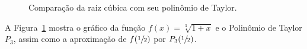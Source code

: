 \begin{figure}
  \begin{center}%
    \vspace{-0.2\baselineskip}%
    \scalebox{0.9}{}%
    \vspace{-\baselineskip}%
  \end{center}
  \caption{Comparação da raiz cúbica com seu polinômio de Taylor.}
  \label{fig:funcao_tayplor_sqrt3}
\end{figure}

A Figura~\ref{fig:funcao_tayplor_sqrt3} mostra o gráfico da função
\(f(x)=\sqrt[3]{1+x}\) e o Polinômio de Taylor $P_3$,
assim como a aproximação de $f(\sfrac{1}{2})$ por $P_3(\sfrac{1}{2})$.

